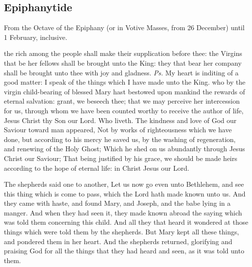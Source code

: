 \subsection{Epiphanytide}
\begin{rubric}
    {From the Octave of the Epiphany (or in Votive Masses, from 26 December) until 1 February, inclusive.}
\end{rubric}


\introit
{} the rich among the people shall make their supplication before thee: the Virgins that be her fellows shall be brought unto the King: they that bear her company shall be brought unto thee with joy and gladness. \textit{Ps.} My heart is inditing of a good matter: I speak of the things which I have made unto the King.
\collect
{} who by the virgin child-bearing of blessed Mary hast bestowed upon mankind the rewards of eternal salvation: grant, we beseech thee; that we may perceive her intercession for us, through whom we have been counted worthy to receive the author of life, Jesus Christ thy Son our Lord. Who liveth.
 The kindness and love of God our Saviour toward man appeared, Not by works of righteousness which we have done, but according to his mercy he saved us, by the washing of regeneration, and renewing of the Holy Ghost; Which he shed on us abundantly through Jesus Christ our Saviour; That being justified by his grace, we should be made heirs according to the hope of eternal life: in Christ Jesus our Lord.

\vspace{-0.25\baselineskip}

 The shepherds said one to another, Let us now go even unto Bethlehem, and see this thing which is come to pass, which the Lord hath made known unto us. And they came with haste, and found Mary, and Joseph, and the babe lying in a manger. And when they had seen it, they made known abroad the saying which was told them concerning this child. And all they that heard it wondered at those things which were told them by the shepherds. But Mary kept all these things, and pondered them in her heart. And the shepherds returned, glorifying and praising God for all the things that they had heard and seen, as it was told unto them.

